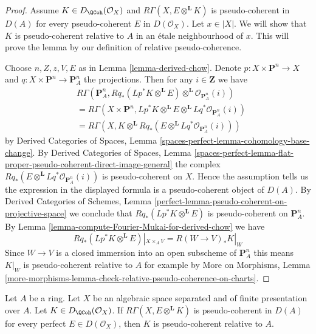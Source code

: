 \begin{proof}
Assume $K \in D_\QCoh(\mathcal{O}_X)$ and
$R\Gamma(X, E \otimes^\mathbf{L} K)$ is pseudo-coherent
in $D(A)$ for every pseudo-coherent $E$ in $D(\mathcal{O}_X)$.
Let $x \in |X|$. We will show that $K$ is pseudo-coherent relative to $A$
in an \'etale neighbourhood of $x$. This will prove the lemma
by our definition of relative pseudo-coherence.

\medskip\noindent
Choose $n, Z, z, V, E$ as in Lemma \ref{lemma-derived-chow}.
Denote $p : X \times \mathbf{P}^n \to X$ and
$q : X \times \mathbf{P}^n \to \mathbf{P}^n_A$
the projections.
Then for any $i \in \mathbf{Z}$ we have
\begin{align*}
& R\Gamma(\mathbf{P}^n_A,
Rq_*(Lp^*K \otimes^\mathbf{L} E)
\otimes^\mathbf{L}
\mathcal{O}_{\mathbf{P}^n_A}(i)) \\
& =
R\Gamma(X \times \mathbf{P}^n,
Lp^*K \otimes^\mathbf{L} E \otimes^\mathbf{L}
Lq^*\mathcal{O}_{\mathbf{P}^n_A}(i)) \\
& =
R\Gamma(X,
K \otimes^\mathbf{L} Rq_*(E \otimes^\mathbf{L}
Lq^*\mathcal{O}_{\mathbf{P}^n_A}(i)))
\end{align*}
by
Derived Categories of Spaces,
Lemma \ref{spaces-perfect-lemma-cohomology-base-change}.
By
Derived Categories of Spaces, Lemma
\ref{spaces-perfect-lemma-flat-proper-pseudo-coherent-direct-image-general}
the complex $Rq_*(E \otimes^\mathbf{L} Lq^*\mathcal{O}_{\mathbf{P}^n_A}(i))$
is pseudo-coherent on $X$. Hence the assumption tells us the expression
in the displayed formula is a pseudo-coherent object of $D(A)$.
By
Derived Categories of Schemes,
Lemma \ref{perfect-lemma-pseudo-coherent-on-projective-space}
we conclude that $Rq_*(Lp^*K \otimes^\mathbf{L} E)$ is
pseudo-coherent on $\mathbf{P}^n_A$.
By Lemma \ref{lemma-compute-Fourier-Mukai-for-derived-chow}
we have
$$
Rq_*(Lp^*K \otimes^\mathbf{L} E)|_{X \times_A V} =
R(W \to V)_*K|_W
$$
Since $W \to V$ is a closed immersion into an open subscheme of
$\mathbf{P}^n_A$ this means $K|_W$ is pseudo-coherent relative to $A$
for example by
More on Morphisms,
Lemma \ref{more-morphisms-lemma-check-relative-pseudo-coherence-on-charts}.
\end{proof}

\begin{lemma}
\label{lemma-characterize-pseudo-coh-improved}
Let $A$ be a ring. Let $X$ be an algebraic space separated and
of finite presentation over $A$. Let $K \in D_\QCoh(\mathcal{O}_X)$. If 
$R \Gamma (X, E \otimes ^{\mathbf{L}} K)$ is
pseudo-coherent in $D(A)$ for every perfect 
$E \in D(\mathcal{O}_X)$, then $K$ is pseudo-coherent
relative to $A$.
\end{lemma}

